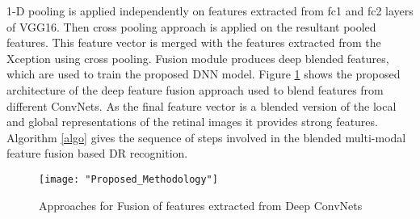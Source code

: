 \documentclass[electronics,article,accept ,moreauthors,pdftex]{mdpi}
\begin{document}
1-D pooling is applied independently on features extracted from fc1 and fc2 layers of VGG16. Then cross pooling approach is applied on the resultant pooled features. This feature vector is merged with the features extracted from the Xception using cross pooling. Fusion module produces deep blended features, which are used to train the proposed DNN model.  Figure \ref{fig:proposed} shows the proposed architecture of the deep feature fusion approach used to blend features from different ConvNets. As the final feature vector is a blended version of the local and global representations of the retinal images it provides strong features. Algorithm \ref{algo} gives the sequence of steps involved in the blended multi-modal feature fusion based DR recognition.  
\begin{figure}[h]
    \centering
    \texttt{[image: "Proposed\_Methodology"]}
    \caption{Approaches for Fusion of features extracted from Deep ConvNets}
    \label{fig:proposed}
\end{figure}
\end{document}
